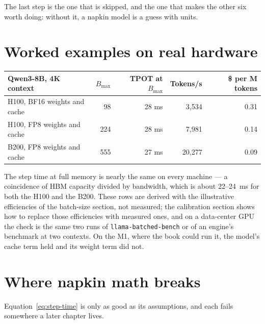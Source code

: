 \noindent The last step is the one that is skipped, and the one that makes the
other six worth doing: without it, a napkin model is a guess with units.

\section{Worked examples on real hardware}

\begin{center}
\begin{tabular}{@{}lrrrr@{}}
\toprule
Qwen3-8B, 4K context & $B_{\max}$ & TPOT at $B_{\max}$ & Tokens/s & \$ per M tokens \\
\midrule
H100, BF16 weights and cache & 98 & 28 ms & 3,534 & 0.31 \\
H100, FP8 weights and cache & 224 & 28 ms & 7,981 & 0.14 \\
B200, FP8 weights and cache & 555 & 27 ms & 20,277 & 0.09 \\
\bottomrule
\end{tabular}
\end{center}

The step time at full memory is nearly the same on every machine --- a
coincidence of HBM capacity divided by bandwidth, which is about 22--24~ms for
both the H100 and the B200. These rows are derived with the illustrative
efficiencies of the batch-size section, not measured; the calibration section
shows how to replace those efficiencies with measured ones, and on a data-center
GPU the check is the same two runs of \texttt{llama-batched-bench} or of an
engine's benchmark at two contexts. On the M1, where the book could run it, the
model's cache term held and its weight term did not.

\section{Where napkin math breaks}

Equation~\eqref{eq:step-time} is only as good as its assumptions, and each
fails somewhere a later chapter lives.

